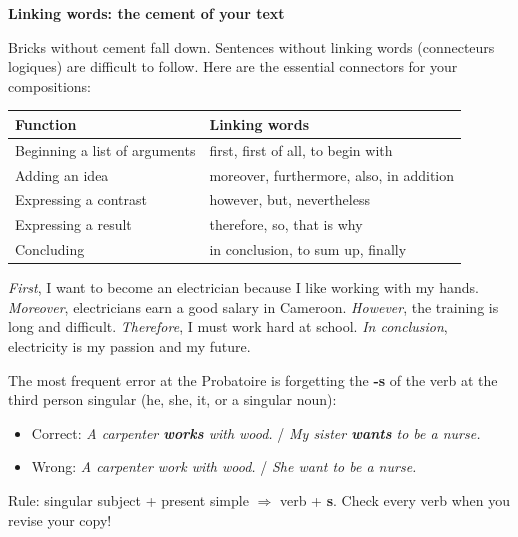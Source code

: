 \documentclass[11pt]{article}
\newcommand{\cle}[1]{{\popxbold\color{popdark}#1}}
\begin{document}
\textbf{Linking words: the cement of your text}\par
Bricks without cement fall down. Sentences without \cle{linking words} (connecteurs logiques) are difficult to follow. Here are the essential connectors for your compositions:

\begin{center}
\begin{tabularx}{\linewidth}{|l|X|}
\hline
\rowcolor{popblueL} \textbf{Function} & \textbf{Linking words} \\
\hline
Beginning a list of arguments & \cle{first}, \cle{first of all}, \cle{to begin with} \\
\hline
Adding an idea & \cle{moreover}, \cle{furthermore}, \cle{also}, \cle{in addition} \\
\hline
Expressing a contrast & \cle{however}, \cle{but}, \cle{nevertheless} \\
\hline
Expressing a result & \cle{therefore}, \cle{so}, \cle{that is why} \\
\hline
Concluding & \cle{in conclusion}, \cle{to sum up}, \cle{finally} \\
\hline
\end{tabularx}
\end{center}

\begin{exemplebox}
\emph{First}, I want to become an electrician because I like working with my hands. \emph{Moreover}, electricians earn a good salary in Cameroon. \emph{However}, the training is long and difficult. \emph{Therefore}, I must work hard at school. \emph{In conclusion}, electricity is my passion and my future.
\end{exemplebox}

\begin{attention}
The most frequent error at the Probatoire is forgetting the \textbf{-s} of the verb at the third person singular (he, she, it, or a singular noun):
\begin{itemize}
\item Correct: \emph{A carpenter \textbf{works} with wood.} / \emph{My sister \textbf{wants} to be a nurse.}
\item Wrong: \emph{A carpenter work with wood.} / \emph{She want to be a nurse.}
\end{itemize}
Rule: singular subject + present simple $\Rightarrow$ verb + \textbf{s}. Check every verb when you revise your copy!
\end{attention}
\end{document}
